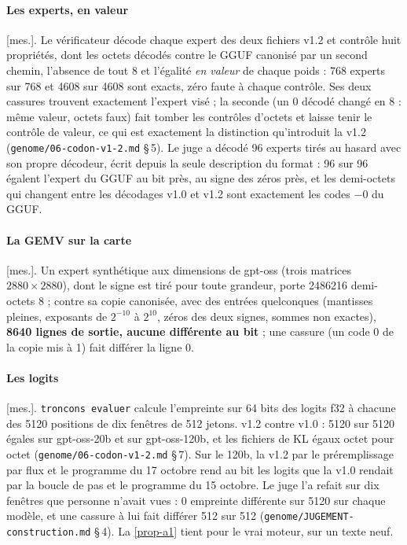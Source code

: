 \documentclass[11pt, a4paper]{article}
\theoremstyle{remark}
\newcommand{\etiq}[1]{\textsf{\scriptsize[#1]}}
\newcommand{\mes}{\etiq{mes.}}
\newcommand{\fichier}[1]{\textsf{\footnotesize\nolinkurl{#1}}}
\begin{document}
\paragraph{Les experts, en valeur} \mes. Le vérificateur décode chaque expert des deux fichiers v1.2 et contrôle huit propriétés, dont les octets décodés contre le GGUF canonisé par un second chemin, l'absence de tout 8 et l'égalité \emph{en valeur} de chaque poids : 768 experts sur 768 et \num{4608} sur \num{4608} sont exacts, zéro faute à chaque contrôle. Ses deux cassures trouvent exactement l'expert visé ; la seconde (un 0 décodé changé en 8 : même valeur, octets faux) fait tomber les contrôles d'octets et laisse tenir le contrôle de valeur, ce qui est exactement la distinction qu'introduit la v1.2 (\fichier{genome/06-codon-v1-2.md} §\,5). Le juge a décodé 96 experts tirés au hasard avec son propre décodeur, écrit depuis la seule description du format : 96 sur 96 égalent l'expert du GGUF au bit près, au signe des zéros près, et les demi-octets qui changent entre les décodages v1.0 et v1.2 sont exactement les codes $-0$ du GGUF.

\paragraph{La GEMV sur la carte} \mes. Un expert synthétique aux dimensions de gpt-oss (trois matrices $2880 \times 2880$), dont le signe est tiré pour toute grandeur, porte \num{2486216} demi-octets 8 ; contre sa copie canonisée, avec des entrées quelconques (mantisses pleines, exposants de $2^{-10}$ à $2^{10}$, zéros des deux signes, sommes non exactes), \textbf{\num{8640} lignes de sortie, aucune différente au bit} ; une cassure (un code 0 de la copie mis à 1) fait différer la ligne 0.

\paragraph{Les logits} \mes. \texttt{troncons evaluer} calcule l'empreinte sur 64 bits des logits f32 à chacune des \num{5120} positions de dix fenêtres de 512 jetons. v1.2 contre v1.0 : \num{5120} sur \num{5120} égales sur gpt-oss-20b et sur gpt-oss-120b, et les fichiers de KL égaux octet pour octet (\fichier{genome/06-codon-v1-2.md} §\,7). Sur le 120b, la v1.2 par le préremplissage par flux et le programme du 17 octobre rend au bit les logits que la v1.0 rendait par la boucle de pas et le programme du 15 octobre. Le juge l'a refait sur dix fenêtres que personne n'avait vues : 0 empreinte différente sur \num{5120} sur chaque modèle, et une cassure à lui fait différer 512 sur 512 (\fichier{genome/JUGEMENT-construction.md} §\,4). La \cref{prop-a1} tient pour le vrai moteur, sur un texte neuf.
\end{document}

